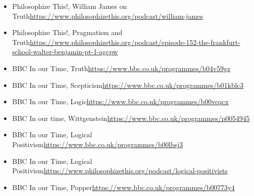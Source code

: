 \documentclass[11pt,a4paper]{report}
\begin{document}
\begin{itemize}
\item Philosophize This!, William James on Truth\newline \href{https://www.philosophizethis.org/podcast/william-james}{https://www.philosophizethis.org/podcast/william-james}

\item Philosophize This!, Pragmatism and Truth\newline \href{https://www.philosophizethis.org/podcast/episode-152-the-frankfurt-school-walter-benjamin-pt-1-agcpw}{https://www.philosophizethis.org/podcast/episode-152-the-frankfurt-school-walter-benjamin-pt-1-agcpw}

\item BBC In our Time, Truth\newline \href{https://www.bbc.co.uk/programmes/b04v59gz}{https://www.bbc.co.uk/programmes/b04v59gz}

\item BBC In our Time, Scepticism\newline \href{https://www.bbc.co.uk/programmes/b01kblc3}{https://www.bbc.co.uk/programmes/b01kblc3}

\item BBC In our Time, Logic\newline \href{https://www.bbc.co.uk/programmes/b00vcqcx}{https://www.bbc.co.uk/programmes/b00vcqcx}

\item BBC In our time, Wittgenstein\newline \href{https://www.bbc.co.uk/programmes/p0054945}{https://www.bbc.co.uk/programmes/p0054945}

\item BBC In our Time, Logical Positivism\newline \href{https://www.bbc.co.uk/programmes/b00lbsj3}{https://www.bbc.co.uk/programmes/b00lbsj3}

\item BBC In our Time, Logical Positivism\newline \href{https://www.philosophizethis.org/podcast/logical-positivists}{https://www.philosophizethis.org/podcast/logical-positivists}

\item BBC In our Time, Popper\newline \href{https://www.bbc.co.uk/programmes/b00773y4}{https://www.bbc.co.uk/programmes/b00773y4}




\end{itemize}
\end{document}
